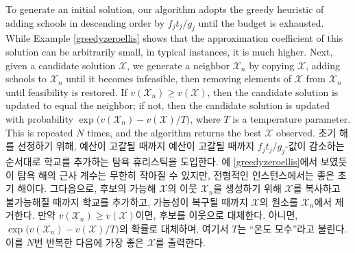 \documentclass[11pt]{article} %
\theoremstyle{definition}
\theoremstyle{definition}
\begin{document}
\ifen
To generate an initial solution, our algorithm adopts the greedy heuristic of adding schools in descending order by $f_j t_j / g_j$ until the budget is exhausted. While Example \ref{greedyzeroellis} shows that the approximation coefficient of this solution can be arbitrarily small, in typical instances, it is much higher. Next, given a candidate solution $\mathcal{X}$, we generate a neighbor $\mathcal{X}_n$ by copying $\mathcal{X}$, adding schools to $\mathcal{X}_n$ until it becomes infeasible, then removing elements of $\mathcal{X}$ from $\mathcal{X}_n$ until feasibility is restored. If $v(\mathcal{X}_n) \geq v(\mathcal{X})$, then the candidate solution is updated to equal the neighbor; if not, then the candidate solution is updated with probability $\exp\bigl(v(\mathcal{X}_n) - v(\mathcal{X}) / T\bigr)$, where $T$ is a temperature parameter. This is repeated $N$ times, and the algorithm returns the best $\mathcal{X}$ observed.
\else
초기 해를 선정하기 위해, 예산이 고갈될 때까지 예산이 고갈될 때까지 $f_j t_j / g_j$-값이 감소하는 순서대로 학교를 추가하는 탐욕 휴리스틱을 도입한다. 예 \ref{greedyzeroellis}에서 보였듯이 탐욕 해의 근사 계수는 무한히 작아질 수 있지만, 전형적인 인스턴스에서는 좋은 초기 해이다. 그다음으로, 후보의 가능해 $\mathcal{X}$의 이웃 $\mathcal{X}_n$을 생성하기 위해 $\mathcal{X}$를 복사하고 불가능해질 때까지 학교를 추가하고, 가능성이 복구될 때까지 $\mathcal{X}$의 원소를 $\mathcal{X}_n$에서 제거한다. 만약 $v(\mathcal{X}_n) \geq v(\mathcal{X})$이면, 후보를 이웃으로 대체한다. 아니면, $\exp\bigl(v(\mathcal{X}_n) - v(\mathcal{X}) / T\bigr)$의 확률로 대체하며, 여기서 $T$는 ``온도 모수''라고 불린다. 이를 $N$번 반복한 다음에 가장 좋은 $\mathcal{X}$를 출력한다.
\fi
\end{document}

